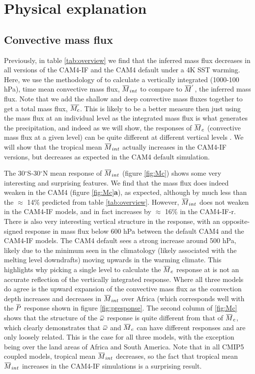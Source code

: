 \documentclass[letterpaper,12pt,titlepage,oneside,final]{book}
\newcommand{\overbar}[1]{\mkern 1.5mu\overline{\mkern-1.5mu#1\mkern-1.5mu}\mkern 1.5mu}
\begin{document}
\section{Physical explanation}
\subsection{Convective mass flux}
Previously, in table \ref{tab:overview} we find that the inferred mass flux decreases in all versions of the CAM4-IF and the CAM4 default under a 4K SST warming. Here, we use the methodology of \citep{chadwick_spatial_2012} to calculate a vertically integrated (1000-100 hPa), time mean convective mass flux, $\overbar{M}_{int}$ to compare to $\overbar{M}^{'}$, the inferred mass flux. Note that we add the shallow and deep convective mass fluxes together to get a total mass flux, $\overbar{M_{c}}$. This is likely to be a better measure then just using the mass flux at an individual level as the integrated mass flux is what generates the precipitation, and indeed as we will show, the responses of $\overbar{M}_{c}$ (convective mass flux at a given level) can be quite different at different vertical levels \citep{chadwick_spatial_2012}. We will show that the tropical mean $\overbar{M}_{int}$ actually increases in the CAM4-IF versions, but decreases as expected in the CAM4 default simulation.

The 30$^{\circ}$S-30$^{\circ}$N mean response of $\overbar{M}_{int}$ (figure \ref{fig:Mc}) shows some very interesting and surprising features. We find that the mass flux does indeed weaken in the CAM4 (figure \ref{fig:Mc}\textbf{a}), as expected, although by much less than the $\approx$ 14\% predicted from table \ref{tab:overview}. However, $\overbar{M}_{int}$ does not weaken in the CAM4-IF models, and in fact increases by $\approx$ 16\% in the CAM4-IF-r. There is also very interesting vertical structure in the response, with an opposite-signed response in mass flux below 600 hPa between the default CAM4 and the CAM4-IF models. The CAM4 default sees a strong increase around 500 hPa, likely due to the minimum seen in the climatology (likely associated with the melting level downdrafts) moving upwards in the warming climate. This highlights why picking a single level to calculate the $\overbar{M}_{c}$ response at is not an accurate reflection of the vertically integrated response. Where all three models do agree is the upward expansion of the convective mass flux as the convection depth increases and decreases in $\overbar{M}_{int}$ over Africa (which corresponds well with the $\overbar{P}$ response shown in figure \ref{fig:presponse}. The second column of \ref{fig:Mc} shows that the structure of the $\overbar{\omega}$ response is quite different from that of $\overbar{M}_{c}$, which clearly demonstrates that $\overbar{\omega}$ and $\overbar{M}_{c}$ can have different responses and are only loosely related. This is the case for all three models, with the exception being over the land areas of Africa and South America. Note that in all CMIP5 coupled models, tropical mean $\overbar{M}_{int}$ decreases, so the fact that tropical mean $\overbar{M}_{int}$ increases in the CAM4-IF simulations is a surprising result.
\end{document}
